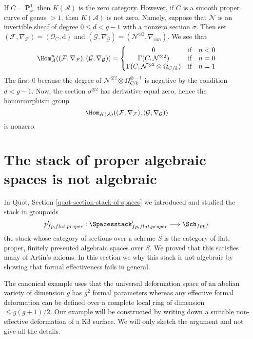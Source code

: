 \medskip\noindent
If $C = \mathbf{P}^1_k$, then $K(\mathcal{A})$ is the zero category.
However, if $C$ is a smooth proper curve of genus $> 1$, then
$K(\mathcal{A})$ is not zero. Namely, suppose that $\mathcal{N}$
is an invertible sheaf
of degree $0 \leq d < g - 1$ with a nonzero section $\sigma$.
Then set
$(\mathcal{F}, \nabla_\mathcal{F}) = (\mathcal{O}_C, \text{d})$
and
$(\mathcal{G}, \nabla_\mathcal{G}) = (\mathcal{N}^{\otimes 2}, \nabla_{can})$.
We see that
$$
\Hom_\mathcal{A}^n((\mathcal{F}, \nabla_\mathcal{F}),
(\mathcal{G}, \nabla_\mathcal{G})) =
\left\{
\begin{matrix}
0 & \text{if} & n < 0 \\
\Gamma(C, \mathcal{N}^{\otimes 2}) & \text{if} & n = 0 \\
\Gamma(C, \mathcal{N}^{\otimes 2} \otimes \Omega_{C/k}) & \text{if} & n = 1
\end{matrix}
\right.
$$
The first $0$ because the degree of
$\mathcal{N}^{\otimes 2} \otimes \Omega_{C/k}^{\otimes -1}$
is negative by the condition $d < g - 1$. Now, the section
$\sigma^{\otimes 2}$ has derivative equal zero, hence the homomorphism
group
$$
\Hom_{K(\mathcal{A})}((\mathcal{F}, \nabla_\mathcal{F}),
(\mathcal{G}, \nabla_\mathcal{G}))
$$
is nonzero.






\section{The stack of proper algebraic spaces is not algebraic}
\label{section-proper-spaces-not-algebraic}

\noindent
In Quot, Section \ref{quot-section-stack-of-spaces}
we introduced and studied the stack in groupoids
$$
p'_{fp, flat, proper} :
\Spacesstack'_{fp, flat, proper}
\longrightarrow
\Sch_{fppf}
$$
the stack whose category of sections over a scheme $S$
is the category of flat, proper, finitely presented algebraic
spaces over $S$. We proved that this satisfies many of
Artin's axioms. In this section we why this stack
is not algebraic by showing that formal effectiveness
fails in general.

\medskip\noindent
The canonical example uses that the universal deformation space of
an abelian variety of dimension $g$ has $g^2$ formal parameters
whereas any effective formal deformation can be defined over a
complete local ring of dimension $\leq g(g + 1)/2$.
Our example will be constructed by writing down a
suitable non-effective deformation of a K3 surface.
We will only sketch the argument and not give all the details.

